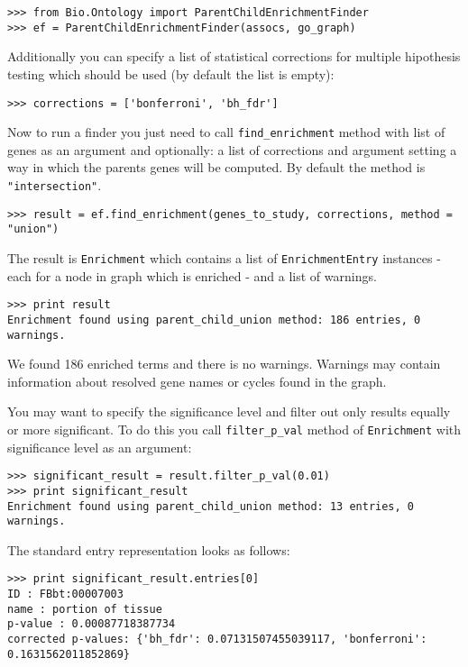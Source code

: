 \begin{verbatim}
>>> from Bio.Ontology import ParentChildEnrichmentFinder
>>> ef = ParentChildEnrichmentFinder(assocs, go_graph)
\end{verbatim}

Additionally you can specify a list of statistical corrections for multiple
hipothesis testing which should be used (by default the list is empty):

\begin{verbatim}
>>> corrections = ['bonferroni', 'bh_fdr']
\end{verbatim}

Now to run a finder you just need to call \verb|find_enrichment| method with list
of genes as an argument and optionally: a list of corrections and argument
setting a way in which the parents genes will be computed. By default the method
is \verb|"intersection"|. 

\begin{verbatim}
>>> result = ef.find_enrichment(genes_to_study, corrections, method =  "union")
\end{verbatim}

The result is \verb|Enrichment| which contains a list of \verb|EnrichmentEntry|
instances - each for a node in graph which is enriched - and a list of warnings.

\begin{verbatim}
>>> print result
Enrichment found using parent_child_union method: 186 entries, 0 warnings.
\end{verbatim}

We found 186 enriched terms and there is no warnings. Warnings may contain
information about resolved gene names or cycles found in the graph.

You may want to specify the significance level and filter out only results
equally or more significant. To do this you call \verb|filter_p_val| method
of \verb|Enrichment| with significance level as an argument:

\begin{verbatim}
>>> significant_result = result.filter_p_val(0.01)
>>> print significant_result
Enrichment found using parent_child_union method: 13 entries, 0 warnings.
\end{verbatim}


The standard entry representation looks as follows:

\begin{verbatim}
>>> print significant_result.entries[0]
ID : FBbt:00007003
name : portion of tissue
p-value : 0.00087718387734
corrected p-values: {'bh_fdr': 0.07131507455039117, 'bonferroni': 0.1631562011852869}
\end{verbatim}

